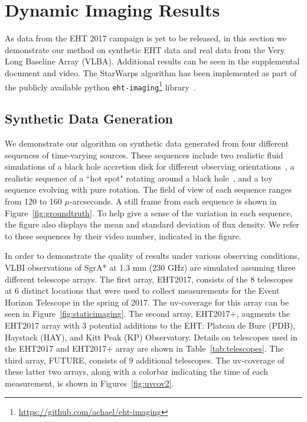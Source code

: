 \vspace{-.07in}
\section{Dynamic Imaging Results}
\label{sec:results}

As data from the EHT 2017 campaign is yet to be released, in this section we demonstrate our method on synthetic EHT data and real data from the Very Long Baseline Array (VLBA). Additional results can be seen in the supplemental document and video. The StarWarps algorithm has been implemented as part of the publicly available python \texttt{eht-imaging}\footnote{\url{https://github.com/achael/eht-imaging}} library~\cite{andrew}.

\vspace{-.2in}
\subsection{Synthetic Data Generation} 

We demonstrate our algorithm on synthetic data generated from four different sequences of time-varying sources. These sequences include two realistic fluid simulations of a black hole accretion disk for different observing orientations~\cite{Shiokawa_2013}, a realistic sequence of a ``hot spot" rotating around a black hole~\cite{Broderick_Loeb_2006}, and a toy sequence evolving with pure rotation. The field of view of each sequence ranges from 120 to 160 $\mu$-arcseconds. A still frame from each sequence is shown in Figure~\ref{fig:groundtruth}. To help give a sense of the variation in each sequence, the figure also displays the mean and standard deviation of flux density. We refer to these sequences by their video number, indicated in the figure. 



In order to demonstrate the quality of results under various observing conditions, VLBI observations of SgrA* at 1.3 mm (230 GHz) are simulated assuming
 three different telescope arrays.  The first array, EHT2017, consists of the 8 telescopes at 6 distinct locations that were used to collect measurements for the Event Horizon Telescope in the spring of 2017. The uv-coverage for this array can be seen in Figure~\ref{fig:staticimaging}. The second array, EHT2017+, augments the EHT2017 array with 3 potential additions to the EHT: Plateau de Bure (PDB), Haystack (HAY), and Kitt Peak (KP) Observatory. 
Details on telescopes used in the EHT2017 and EHT2017+ array are shown in Table~\ref{tab:telescopes}.  
The third array, FUTURE, consists of 9 additional telescopes. The uv-coverage of these latter two arrays, along with a colorbar indicating the time of each measurement, is shown in Figures~\ref{fig:uvcov2}. 


